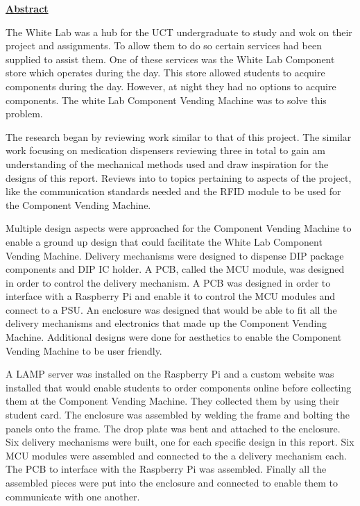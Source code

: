 \documentclass[a4paper,11pt]{article}
\numberwithin{figure}{section}
\numberwithin{table}{section}
\begin{document}
	{\centering\Huge\bfseries\underline{Abstract}\par}

The White Lab was a hub for the UCT undergraduate to study and wok on their project and assignments. To allow them to do so certain services had been supplied to assist them. One of these services was the White Lab Component store which operates during the day. This store allowed students to acquire components during the day. However, at night they had no options to acquire components. The white Lab Component Vending Machine was to solve this problem.

The research began by reviewing work similar to that of this project. The similar work focusing on medication dispensers reviewing three in total to gain am understanding of the mechanical methods used and draw inspiration for the designs of this report. Reviews into to topics pertaining to aspects of the project, like the communication standards needed and the RFID module to be used for the Component Vending Machine.

Multiple design aspects were approached for the Component Vending Machine to enable a ground up design that could facilitate the White Lab Component Vending Machine. Delivery mechanisms were designed to dispense DIP package components and DIP IC holder. A PCB, called the MCU module, was designed in order to control the delivery mechanism. A PCB was designed in order to interface with a Raspberry Pi and enable it to control the MCU modules and connect to a PSU. An enclosure was designed that would be able to fit all the delivery mechanisms and electronics that made up the Component Vending Machine. Additional designs were done for aesthetics to enable the Component Vending Machine to be user friendly.

A LAMP server was installed on the Raspberry Pi and a custom website was installed that would enable students to order components online before collecting them at the Component Vending Machine. They collected them by using their student card. The enclosure was assembled by welding the frame and bolting the panels onto the frame. The drop plate was bent and attached to the enclosure. Six delivery mechanisms were built, one for each specific design in this report. Six MCU modules were assembled and connected to the a delivery mechanism each. The PCB to interface with the Raspberry Pi was assembled. Finally all the assembled pieces were put into the enclosure and connected to enable them to communicate with one another.
\end{document}
